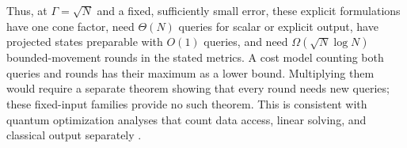 Thus, at $\Gamma=\sqrt N$ and a fixed, sufficiently small error, these
explicit formulations have one cone factor, need $\Theta(N)$ queries for
scalar or explicit output, have projected states preparable with $O(1)$
queries, and need $\Omega(\sqrt N\log N)$ bounded-movement rounds in the
stated metrics. A cost model counting both queries and rounds has their
maximum as a lower bound. Multiplying them would require a separate
theorem showing that every round needs new queries; these fixed-input
families provide no such theorem. This is consistent with quantum
optimization analyses that count data access, linear solving, and
classical output separately \citep{ApersGribling2026}.
